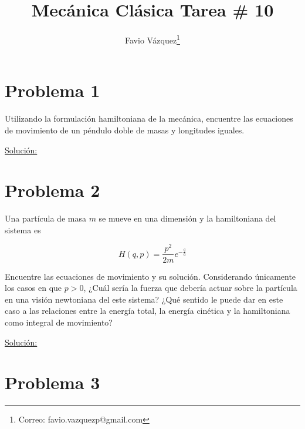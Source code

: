\documentclass[a4paper,10pt]{article}
\title{Mecánica Clásica Tarea \# 10}
\author{Favio Vázquez\thanks{Correo: favio.vazquezp@gmail.com}}\affil{Instituto de Ciencias Nucleares. Universidad Nacional Autónoma de México.}
\date{}
\numberwithin{equation}{section}
\begin{document}
\makeatletter
\def\@maketitle{%
  \newpage
  \null
  \vskip 2em%
  \begin{center}%
  \let \footnote \thanks
    {\Large\bfseries \@title \par}%
    \vskip 1.5em%
    {\normalsize
      \lineskip .5em%
      \begin{tabular}[t]{c}%
        \@author
      \end{tabular}\par}%
    \vskip 1em%
    {\normalsize \@date}%
  \end{center}%
  \par
  \vskip 1.5em}
\makeatother

\maketitle

\section{Problema 1}

Utilizando la formulación hamiltoniana de la mecánica, encuentre las ecuaciones de 
movimiento de un péndulo doble de masas y longitudes iguales.

\vspace{.3cm}

\underline{Solución:} \vspace{.3cm}

\section{Problema 2}

Una partícula de masa $m$ se mueve en una dimensión y la hamiltoniana del sistema 
es 

$$
H(q,p) = \frac{p^2}{2m}e^{-\frac{q}{a}}
$$

Encuentre las ecuaciones de movimiento y su solución. Considerando únicamente los casos 
en que $p>0$, ¿Cuál sería la fuerza que debería actuar sobre la partícula en una visión
newtoniana del este sistema? ¿Qué sentido le puede dar en este caso a las relaciones entre 
la energía total, la energía cinética y la hamiltoniana como integral de movimiento?

\vspace{.3cm}

\underline{Solución:} \vspace{.3cm}

\section{Problema 3}
\end{document}
